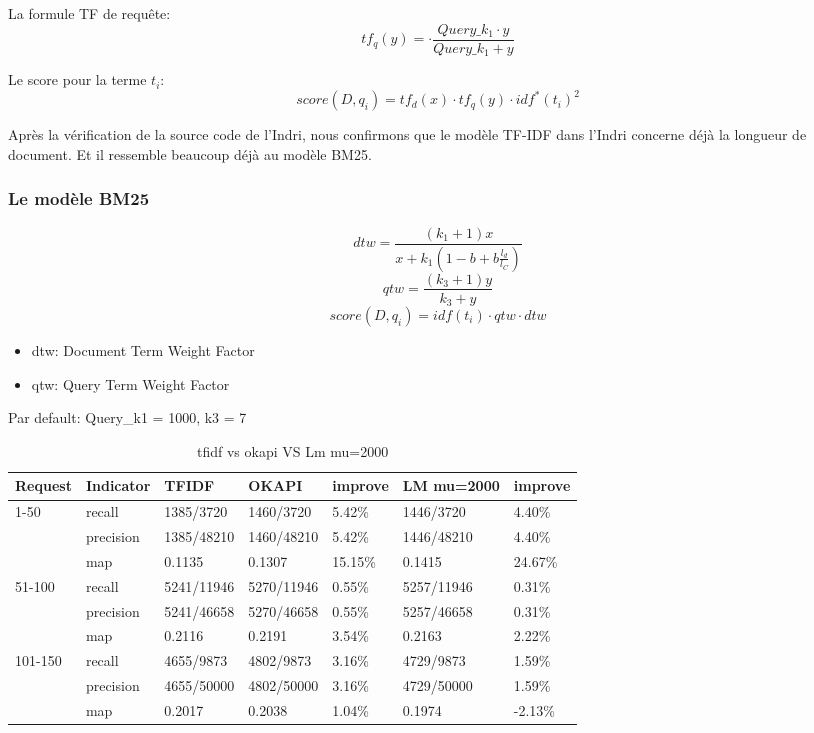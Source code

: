 \documentclass[a4paper]{article}
\begin{document}
La formule TF de requête:
\[tf_{q}( y) = \cdot\frac{Query\_k_{1} \cdot y}{Query\_k_{1} +y}\]

Le score pour la terme $t_{i}$:
\[score(D,q_{i}) = tf_{d}( x) \cdot tf_{q}( y) \cdot idf^{*}(t_{i})^{2} \]

Après la vérification de la source code de l'Indri, nous confirmons que le modèle TF-IDF dans l'Indri concerne déjà la longueur de document. Et il ressemble beaucoup déjà au modèle BM25.

\subsubsection{Le modèle BM25}
\[dtw=\frac{(k_{1}+1) x}{x+k_{1}\left( 1-b+b\frac{l_{d}}{l_{C}}\right)}\]
\[qtw=\frac{( k_{3} +1) y}{k_{3} +y}\]
\[score(D,q_{i}) =idf(t_{i})\cdot qtw \cdot dtw \]

\begin{itemize}
\item dtw: Document Term Weight Factor
\item qtw: Query Term Weight Factor
\end{itemize}



Par default: Query\_k1 = 1000, k3 = 7

\begin{table}[htp]
\centering
\begin{tabular}{|l|l|l|l|l|l|l|}
\hline
Request & Indicator & TFIDF      & OKAPI      & improve & LM mu=2000 & improve \\ \hline
1-50    & recall    & 1385/3720  & 1460/3720  & 5.42\%  & 1446/3720  & 4.40\%  \\ \hline
        & precision & 1385/48210 & 1460/48210 & 5.42\%  & 1446/48210 & 4.40\%  \\ \hline
        & map       & 0.1135     & 0.1307     & 15.15\% & 0.1415     & 24.67\% \\ \hline
51-100  & recall    & 5241/11946 & 5270/11946 & 0.55\%  & 5257/11946 & 0.31\%  \\ \hline
        & precision & 5241/46658 & 5270/46658 & 0.55\%  & 5257/46658 & 0.31\%  \\ \hline
        & map       & 0.2116     & 0.2191     & 3.54\%  & 0.2163     & 2.22\%  \\ \hline
101-150 & recall    & 4655/9873  & 4802/9873  & 3.16\%  & 4729/9873  & 1.59\%  \\ \hline
        & precision & 4655/50000 & 4802/50000 & 3.16\%  & 4729/50000 & 1.59\%  \\ \hline
        & map       & 0.2017     & 0.2038     & 1.04\%  & 0.1974     & -2.13\% \\ \hline
\end{tabular}
\caption{tfidf vs okapi VS Lm mu=2000}
\label{tab:tfidf-okapi-lm}
\end{table}
\end{document}
